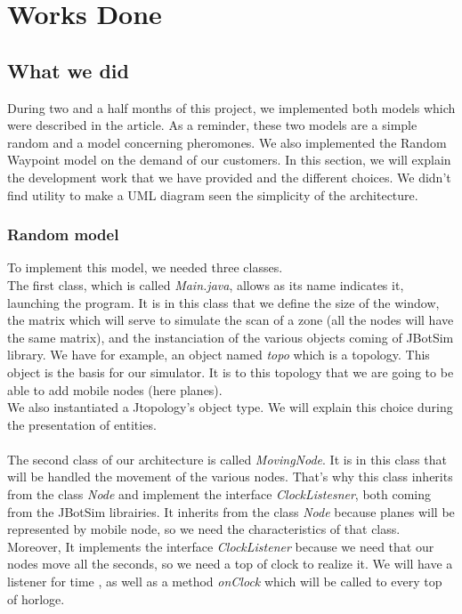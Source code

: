 \chapter{Works Done}

\section{What we did}

During two and a half months of this project, we implemented both models which were described in the article. As a reminder, these two models are a simple random and a model concerning pheromones. We also implemented the Random Waypoint model on the demand of our customers. In this section, we will explain the development work that we have provided and the different choices. We didn't find utility to make a UML diagram seen the simplicity of the architecture.

\subsection{Random model} 

To implement this model, we needed three classes.\\
The first class, which is called \textit{Main.java}, allows as its name indicates it, launching the program. It is in this class that we define the size of the window, the matrix which will serve to simulate the scan of a zone (all the nodes will have the same matrix), and the instanciation of the various objects coming of JBotSim library. We have for example, an object named \textit{topo} which is a topology. This object is the basis for our simulator. It is to this topology that we are going to be able to add mobile nodes (here planes).\\

We also instantiated a Jtopology's object type. We will explain this choice during the presentation of entities.\\\\

The second class of our architecture is called \textit{MovingNode}. It is in this class that will be handled the movement of the various nodes. That's why this class inherits from the class \textit{Node} and implement the interface \textit{ClockListesner}, both coming from the JBotSim librairies. It inherits from the class \textit{Node} because planes will be represented by mobile node, so we need the characteristics of that class. Moreover, It implements the interface \textit{ClockListener} because we need that our nodes move all the seconds, so we need a top of clock to realize it. We will have a listener for time , as well as a method \textit{onClock} which will be called to every top of horloge.\\\\

